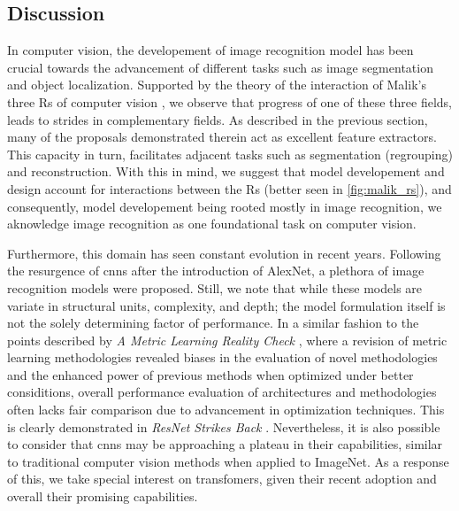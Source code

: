 \subsection{Discussion}
\label{subsec:rel_recon_discussion}
In computer vision, the developement of image recognition model has been crucial 
towards the advancement of different tasks such as image segmentation and object localization. 
Supported by the theory of the interaction of Malik's three Rs of computer vision 
\autocite{malik2016three}, we observe that progress of one of these three fields, leads to strides 
in complementary fields. As described in the previous section, many of the proposals demonstrated 
therein act as excellent feature extractors. This capacity in turn, facilitates adjacent tasks 
such as segmentation (regrouping) and reconstruction. With this in mind, we suggest that model 
developement and design account for interactions between the Rs (better seen in  
\autoref{fig:malik_rs}), and consequently, model developement being rooted mostly in image 
recognition, we aknowledge image recognition as one foundational task on computer vision.



\noindent Furthermore, this domain has seen constant evolution in recent years. Following the 
resurgence of \glspl{cnn} after the introduction of AlexNet, a plethora of image recognition models 
were proposed. Still, we note that while these models are variate in structural units, complexity, 
and depth; the model formulation  itself is not the solely determining factor of performance.  
In a similar fashion to the points described by \emph{A Metric Learning Reality 
Check} \autocite{musgrave2020metric}, where a revision of metric learning methodologies revealed 
biases in the evaluation of novel methodologies and the enhanced power of 
previous methods when optimized under better considitions, overall performance evaluation of 
architectures and methodologies often lacks fair comparison due to advancement in optimization 
techniques. This is clearly demonstrated in \emph{ResNet Strikes Back} \autocite{wightman2021resnet}. 
Nevertheless, it is also possible to consider that \glspl{cnn} may be approaching a plateau in 
their capabilities, similar to traditional computer vision methods  when applied to ImageNet. As 
a response of this, we take special interest on transfomers, given their recent adoption and 
overall their promising capabilities. \\

